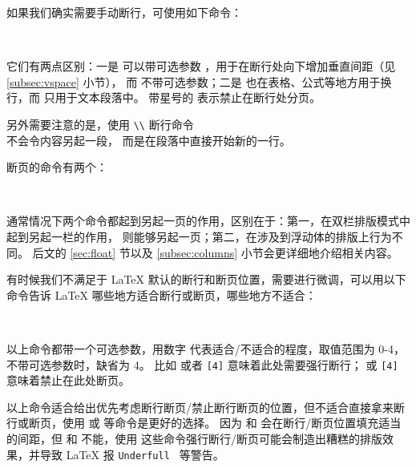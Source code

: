  
如果我们确实需要手动断行，可使用如下命令：
\begin{command}
\crcmd {} \qquad
\crcmd*{} \\
\end{command}

它们有两点区别：一是 \crcmd{} 可以带可选参数 ，用于在断行处向下增加垂直间距（见 \ref{subsec:vspace} 小节），
而  不带可选参数；二是 \crcmd{} 也在表格、公式等地方用于换行，而  只用于文本段落中。
带星号的 \crcmd{} 表示禁止在断行处分页。

\begin{example}
另外需要注意的是，使用 \verb|\\|
断行命令 \\ 不会令内容另起一段，
而是在段落中直接开始新的一行。
\end{example}

断页的命令有两个：
\begin{command}
 \\
\end{command}

通常情况下两个命令都起到另起一页的作用，区别在于：第一，在双栏排版模式中  起到另起一栏的作用， 则能够另起一页；第二，在涉及到浮动体的排版上行为不同。
后文的 \ref{sec:float} 节以及 \ref{subsec:columns} 小节会更详细地介绍相关内容。

有时候我们不满足于 \LaTeX{} 默认的断行和断页位置，需要进行微调，可以用以下命令告诉 \LaTeX{} 哪些地方适合断行或断页，哪些地方不适合：
\begin{command}
 \quad {} \\
 \quad {}
\end{command}

以上命令都带一个可选参数，用数字  代表适合/不适合的程度，取值范围为 0-4，不带可选参数时，缺省为 4。
比如  或者 \texttt{[4]} 意味着此处需要强行断行； 或 \texttt{[4]}
意味着禁止在此处断页。

以上命令适合给出优先考虑断行断页/禁止断行断页的位置，但不适合直接拿来断行或断页，使用  或  等命令是更好的选择。
因为  和  会在断行/断页位置填充适当的间距，但  和  不能，使用
这些命令强行断行/断页可能会制造出糟糕的排版效果，并导致 \LaTeX{} 报 \texttt{Underfull } 等警告。

